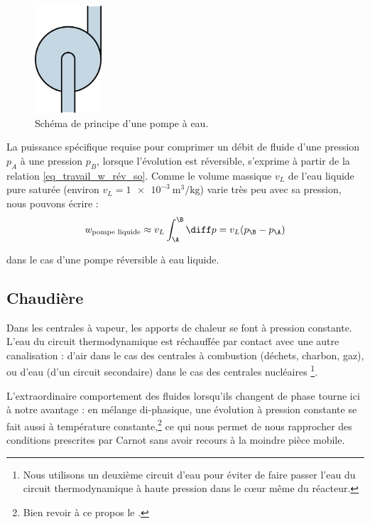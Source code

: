 		\begin{figure}
			\begin{center}
				\includegraphics[height=4cm]{images/symbole_pompe.png}
			\end{center}
			\caption{Schéma de principe d’une pompe à eau.}
			\label{fig_centrale_pompe2}
		\end{figure}

		La puissance spécifique requise pour comprimer un débit de fluide d’une pression $p_A$ à une pression $p_B$, lorsque l’évolution est réversible, s’exprime à partir de la relation \ref{eq_travail_w_rév_so}. Comme le volume massique $v_L$  de l’eau liquide pure saturée (environ $v_L = \SI{1e-3}{\metre\cubed\per\kilogram}$) varie très peu avec sa pression, nous pouvons écrire :
		\begin{equation}
			{w}_\text{pompe~liquide} \approx v_L \int_\A^\B \diff p = v_L (p_\B - p_\A )
		\end{equation}

		\begin{description}
			\item dans le cas d’une pompe réversible à eau liquide.
		\end{description}

		 

	\subsection{Chaudière}
	\label{ch_chaudière}

		Dans les centrales à vapeur, les apports de chaleur se font à pression constante. L’eau du circuit thermodynamique est réchauffée par contact avec une autre canalisation : d’air dans le cas des centrales à combustion (déchets, charbon, gaz), ou d’eau (d’un circuit secondaire) dans le cas des centrales nucléaires%
		\footnote{Nous utilisons un deuxième circuit d’eau pour éviter de faire passer l’eau du circuit thermodynamique à haute pression dans le cœur même du réacteur.}\nolinebreak.

		L’extraordinaire comportement des fluides lorsqu’ils changent de phase tourne ici à notre avantage : en mélange di-phasique, une évolution à pression constante se fait aussi à température constante,\footnote{Bien revoir à ce propos le \courscinq.}
		ce qui nous permet de nous rapprocher des conditions prescrites par Carnot sans avoir recours à la moindre pièce mobile.
		
